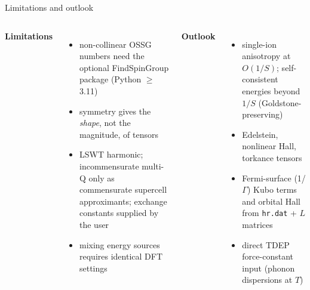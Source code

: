 \documentclass[aspectratio=169,11pt]{beamer}
\begin{document}
\begin{frame}{Limitations and outlook}
\begin{columns}[T]
\textbf{Limitations}
\begin{itemize}\setlength\itemsep{0.35em}
  \item non-collinear OSSG numbers need the optional FindSpinGroup package (Python $\ge$ 3.11)
  \item symmetry gives the \emph{shape}, not the magnitude, of tensors
  \item LSWT harmonic; incommensurate multi-Q only as commensurate supercell approximants; exchange constants supplied by the user
  \item mixing energy sources requires identical DFT settings
\end{itemize}
\textbf{Outlook}
\begin{itemize}\setlength\itemsep{0.35em}
  \item single-ion anisotropy at $O(1/S)$; self-consistent energies beyond $1/S$ (Goldstone-preserving)
  \item Edelstein, nonlinear Hall, torkance tensors
  \item Fermi-surface (1/$\Gamma$) Kubo terms and orbital Hall from \texttt{hr.dat} + $L$ matrices
  \item direct TDEP force-constant input (phonon dispersions at $T$)
\end{itemize}
\end{columns}
\end{frame}
\end{document}
